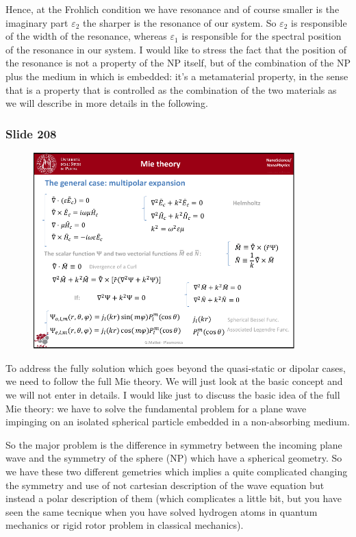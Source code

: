 \documentclass[../main/main.tex]{subfiles}
\begin{document}
Hence, at the Frohlich condition we have resonance and of course smaller is the imaginary part \( \varepsilon _2 \) the sharper is the resonance of our system.  So \( \varepsilon _2 \) is responsible of the width of the resonance, whereas \( \varepsilon _1 \) is responsible for the spectral position of the resonance in our system.
I would like to stress the fact that the position of the resonance is not a property of the NP itself, but of the combination of the NP plus the medium in which is embedded: it's a metamaterial property, in the sense that is a property that is controlled as the combination of the two materials as we will describe in more details in the following.

\newpage

\subsubsection{Slide 208}

\begin{figure}[h!]
\centering
\includegraphics[page=1,width=0.9\textwidth]{../lessons/pdf_file/13_lesson.pdf}
\end{figure}

To address the fully solution which goes beyond the quasi-static or dipolar cases, we need to follow the full Mie theory.
We will just look at the basic concept and we will not enter in details. I would like just to discuss the basic idea of the full Mie theory: we have to solve the fundamental problem for a plane wave impinging on an isolated spherical particle embedded in a non-absorbing medium.

So the major problem is the difference in symmetry between the incoming plane wave and the symmetry of the sphere (NP) which have a spherical geometry.
So we have these two different gemetries which implies a quite complicated changing the symmetry and use of not cartesian description of the wave equation but instead a polar description of them (which complicates a little bit, but you have seen the same tecnique when you have solved hydrogen atoms in quantum mechanics or rigid rotor problem in classical mechanics).
\end{document}
